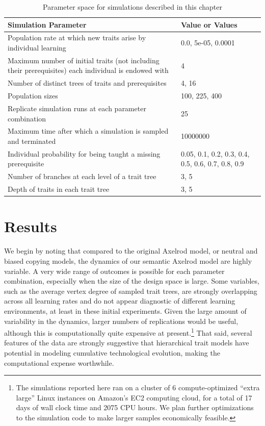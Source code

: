 \begin{table}[H]
\begin{tabular}{|p{}|p{}|}
\hline
\textbf{Simulation Parameter} & \textbf{Value or Values} \\ 
\hline
Population rate at which new traits arise by individual learning & 0.0, 5e-05, 0.0001\\ 
 \hline 
Maximum number of initial traits (not including their prerequisites) each individual is endowed with & 4\\ 
 \hline 
Number of distinct trees of traits and prerequisites & 4, 16\\ 
 \hline 
Population sizes & 100, 225, 400\\ 
 \hline 
Replicate simulation runs at each parameter combination & 25\\ 
 \hline 
Maximum time after which a simulation is sampled and terminated & 10000000\\ 
 \hline 
Individual probability for being taught a missing prerequisite & 0.05, 0.1, 0.2, 0.3, 0.4, 0.5, 0.6, 0.7, 0.8, 0.9\\ 
 \hline 
Number of branches at each level of a trait tree & 3, 5\\ 
 \hline 
Depth of traits in each trait tree & 3, 5\\ 
 \hline 
\hline
\end{tabular}
\caption{Parameter space for simulations described in this chapter}
\label{tab:axelrodct-sim-parameters}
\end{table}

\section{Results}\label{results}

We begin by noting that compared to the original Axelrod model, or
neutral and biased copying models, the dynamics of our semantic Axelrod
model are highly variable. A very wide range of outcomes is possible for
each parameter combination, especially when the size of the design space
is large. Some variables, such as the average vertex degree of sampled
trait trees, are strongly overlapping across all learning rates and do
not appear diagnostic of different learning environments, at least in
these initial experiments. Given the large amount of variability in the
dynamics, larger numbers of replications would be useful, although this
is computationally quite expensive at present.\footnote{The simulations
  reported here ran on a cluster of 6 compute-optimized ``extra large''
  Linux instances on Amazon's EC2 computing cloud, for a total of 17
  days of wall clock time and 2075 CPU hours. We plan further
  optimizations to the simulation code to make larger samples
  economically feasible.} That said, several features of the data are
strongly suggestive that hierarchical trait models have potential in
modeling cumulative technological evolution, making the computational
expense worthwhile.


